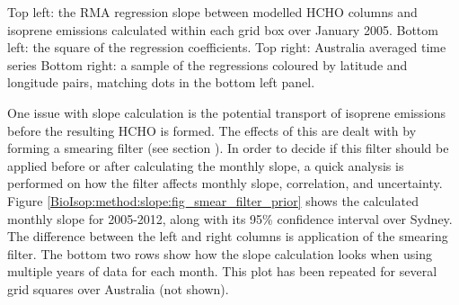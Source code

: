     
    { %
      Top left: the RMA regression slope between modelled HCHO columns and isoprene emissions calculated within each grid box over January 2005.
      Bottom left: the square of the regression coefficients.
      Top right: Australia averaged time series 
      Bottom right: a sample of the regressions coloured by latitude and longitude pairs, matching dots in the bottom left panel.
    }
    {\label{BioIsop:method:slope:fig_regressions}}
    
    One issue with slope calculation is the potential transport of isoprene emissions before the resulting HCHO is formed.
    The effects of this are dealt with by forming a smearing filter (see section ).
    In order to decide if this filter should be applied before or after calculating the monthly slope, a quick analysis is performed on how the filter affects monthly slope, correlation, and uncertainty.
    Figure \ref{BioIsop:method:slope:fig_smear_filter_prior} shows the calculated monthly slope for 2005-2012, along with its 95\% confidence interval over Sydney.
    The difference between the left and right columns is application of the smearing filter.
    The bottom two rows show how the slope calculation looks when using multiple years of data for each month.
    This plot has been repeated for several grid squares over Australia (not shown).
    
    
    
    
